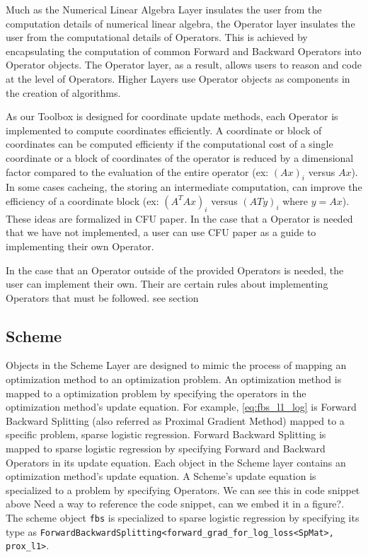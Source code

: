 Much as the Numerical Linear Algebra Layer insulates the user from the computation details of numerical linear algebra, the Operator layer insulates the user from the computational details of Operators. This is achieved by encapsulating the computation of common Forward and Backward Operators into Operator objects. The Operator layer, as a result, allows users to reason and code at the level of Operators. Higher Layers use Operator objects as components in the creation of algorithms.

As our Toolbox is designed for coordinate update methods, each Operator is implemented to compute coordinates efficiently. A coordinate or block of coordinates can be computed efficienty if the computational cost of a single coordinate or a block of coordinates of the operator is reduced by a dimensional factor compared to the evaluation of the entire operator (ex: $(Ax)_i$ versus $Ax$). In some cases cacheing, the storing an intermediate computation, can improve the efficiency of a coordinate block (ex: $(A^TAx)_i$ versus $(ATy)_i$ where $y=Ax$). These ideas are formalized in CFU paper.  In the case that a Operator is needed that we have not implemented, a user can use CFU paper as a guide to  implementing their own Operator. 

In the case that an Operator outside of the provided Operators is needed, the user can implement their own. Their are certain rules about implementing Operators that must be followed. see section
 

\subsection{Scheme}

Objects in the Scheme Layer are designed to mimic the process of mapping an optimization method to an optimization problem.
An optimization method is mapped to a optimization problem by specifying the operators in the optimization method's update equation.
For example, \eqref{eq:fbs_l1_log} is Forward Backward Splitting (also referred as Proximal Gradient Method) mapped to a specific problem, sparse logistic regression.
Forward Backward Splitting is mapped to sparse logistic regression by specifying Forward and Backward Operators in its update equation.
Each object in the Scheme layer contains an optimization method's update equation.
A Scheme's update equation is specialized to a problem by specifying Operators. We can see this in code snippet above {\color{red} Need a way to reference the code snippet, can we embed it in a figure?}.
The scheme object \texttt{fbs} is specialized to sparse logistic regression by specifying its type as \texttt{ForwardBackwardSplitting<forward\_grad\_for\_log\_loss<SpMat>, prox\_l1>}.
  
